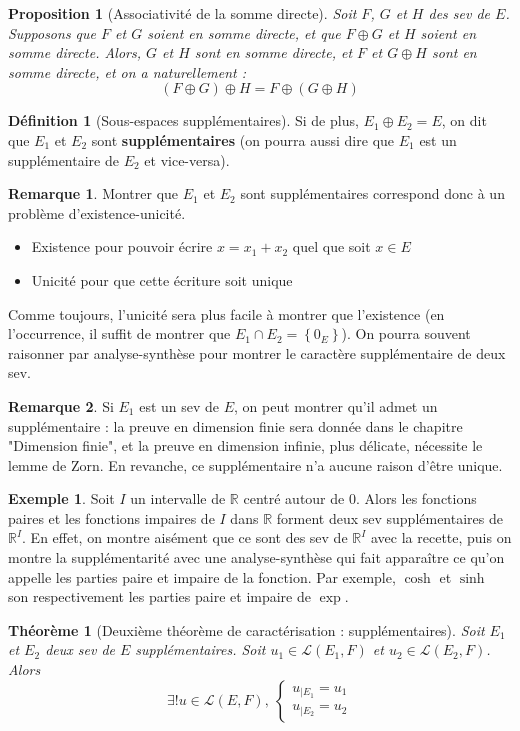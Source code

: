 \documentclass[french]{book}
\newcommand{\R}{\mathbb{R}}
\theoremstyle{plain}
\newtheorem{thm}{Théorème}[chapter]
\newtheorem{prop}{Proposition}[chapter]
\theoremstyle{definition}
\newtheorem{dfn}{Définition}[chapter]
\newtheorem{exa}{Exemple}[chapter]
\newtheorem{rmq}{Remarque}[chapter]
\theoremstyle{remark}
\begin{document}
\begin{prop}[Associativité de la somme directe]
	Soit $F$, $G$ et $H$ des sev de $E$. Supposons que $F$ et $G$ soient en somme directe, et que $F\oplus G$ et $H$ soient en somme directe. Alors, $G$ et $H$ sont en somme directe, et $F$ et $G\oplus H$ sont en somme directe, et on a naturellement : $$(F\oplus G)\oplus H=F\oplus(G\oplus H)$$
\end{prop}
\begin{dfn}[Sous-espaces supplémentaires]
	Si de plus, $E_1\oplus E_2=E$, on dit que $E_1$ et $E_2$ sont \textbf{supplémentaires} (on pourra aussi dire que $E_1$ est un supplémentaire de $E_2$ et vice-versa).
\end{dfn}
\begin{rmq}
	Montrer que $E_1$ et $E_2$ sont supplémentaires correspond donc à un problème d'existence-unicité.
	\begin{itemize}
		\item Existence pour pouvoir écrire $x=x_1+x_2$ quel que soit $x\in E$
		\item Unicité pour que cette écriture soit unique
	\end{itemize}
	Comme toujours, l'unicité sera plus facile à montrer que l'existence (en l'occurrence, il suffit de montrer que $E_1\cap E_2=\left\{0_E\right\}$). On pourra souvent raisonner par analyse-synthèse pour montrer le caractère supplémentaire de deux sev.
\end{rmq}
\begin{rmq}
	Si $E_1$ est un sev de $E$, on peut montrer qu'il admet un supplémentaire : la preuve en dimension finie sera donnée dans le chapitre "Dimension finie", et la preuve en dimension infinie, plus délicate, nécessite le lemme de Zorn. En revanche, ce supplémentaire n'a aucune raison d'être unique.
\end{rmq}
\begin{exa}
	Soit $I$ un intervalle de $\R$ centré autour de $0$. Alors les fonctions paires et les fonctions impaires de $I$ dans $\R$ forment deux sev supplémentaires de $\R^I$. En effet, on montre aisément que ce sont des sev de $\R^I$ avec la recette, puis on montre la supplémentarité avec une analyse-synthèse qui fait apparaître ce qu'on appelle les parties paire et impaire de la fonction. Par exemple, $\cosh$ et $\sinh$ son respectivement les parties paire et impaire de $\exp$.
\end{exa}
\begin{thm}[Deuxième théorème de caractérisation : supplémentaires]
	Soit $E_1$ et $E_2$ deux sev de $E$ supplémentaires. Soit $u_1\in\mathcal{L}(E_1,F)$ et $u_2\in\mathcal{L}(E_2,F)$. Alors $$\exists! u\in\mathcal{L}(E,F),\ \left \{\begin{array}{ll}u_{|E_1}=u_1\\ u_{|E_2}=u_2\end{array}\right.$$
\end{thm}
\end{document}
